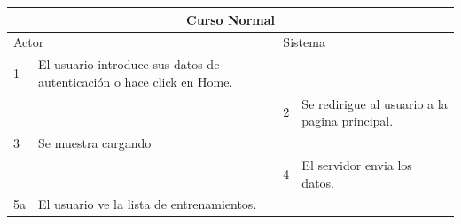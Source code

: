 \begin{itemize}
\begin{itemize}
\begin{table}[H]
\begin{tabularx}{\textwidth}{|l|X|l|X|}
        \hline
        \multicolumn{4}{|c|}{\cellcolor[HTML]{C0C0C0}Curso Normal}                                                 \\ \hline
        \multicolumn{2}{|l|}{\cellcolor[HTML]{EFEFEF}Actor} & \multicolumn{2}{l|}{\cellcolor[HTML]{EFEFEF}Sistema} \\ \hline
        1                         & El usuario introduce sus datos de autenticación o hace click en Home.                        &                            &                         \\ \hline
                                  &                         & 2                          & Se redirigue al usuario a la pagina principal.                      \\ \hline
        3                         &   Se muestra cargando                      &                           &                    \\ \hline
                                  &                         & 4                          & El servidor envia los datos.                        \\ \hline
        5a                        & El usuario ve la lista de entrenamientos.      &                          &                        \\ \hline
                                  

\end{tabularx}
\end{table}
\end{itemize}
\end{itemize}
